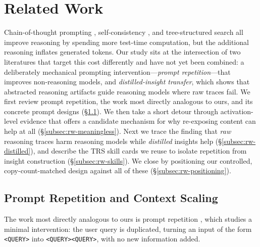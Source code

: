 \section{Related Work}

Chain-of-thought prompting \citep{wei2022chain}, self-consistency
\citep{wang2022self}, and tree-structured search \citep{yao2023tree} all improve
reasoning by spending more test-time computation, but the additional reasoning
inflates generated tokens. Our study sits at the intersection of two literatures
that target this cost differently and have not yet been combined: a deliberately
mechanical prompting intervention---\emph{prompt repetition}---that improves
non-reasoning models, and \emph{distilled-insight transfer}, which shows that
abstracted reasoning artifacts guide reasoning models where raw traces fail. We
first review prompt repetition, the work most directly analogous to ours, and its
concrete prompt designs (\S\ref{subsec:rw-repetition}). We then take a short detour
through activation-level evidence that offers a candidate mechanism for why
re-exposing content can help at all (\S\ref{subsec:rw-meaningless}). Next we trace
the finding that \emph{raw} reasoning traces harm reasoning models while
\emph{distilled} insights help (\S\ref{subsec:rw-distilled}), and describe the TRS
skill cards we reuse to isolate repetition from insight construction
(\S\ref{subsec:rw-skills}). We close by positioning our controlled,
copy-count-matched design against all of these (\S\ref{subsec:rw-positioning}).

\subsection{Prompt Repetition and Context Scaling}
\label{subsec:rw-repetition}

The work most directly analogous to ours is prompt repetition
\citep{leviathan2025prompt}, which studies a minimal intervention: the user query
is duplicated, turning an input of the form \texttt{<QUERY>} into
\texttt{<QUERY><QUERY>}, with no new information added.

